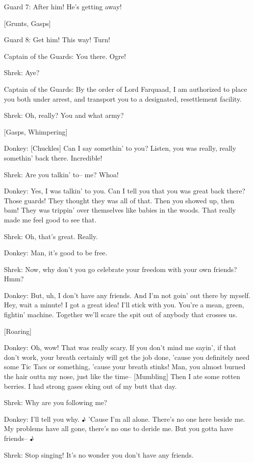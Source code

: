 \documentclass{article}
\begin{document}
Guard 7:
After him! He's getting away!

[Grunts, Gasps]

Guard 8:
Get him! This way! Turn!

Captain of the Guards: You there. Ogre!

Shrek:
Aye?

Captain of the Guards: By the order of Lord Farquaad, I am authorized to place you both under arrest, and transport you to a designated, resettlement facility.

Shrek:
Oh, really? You and what army?

[Gasps, Whimpering]

Donkey:
[Chuckles] Can I say somethin' to you? Listen, you was really, really somethin' back there. Incredible!

Shrek:
Are you talkin' to-- me? Whoa!

Donkey:
Yes, I was talkin' to you. Can I tell you that you was great back there? Those guards! They thought they was all of that. Then you showed up, then bam! They was trippin' over themselves like babies in the woods. That really made me feel good to see that.

Shrek:
Oh, that's great. Really.

Donkey:
Man, it's good to be free.

Shrek:
Now, why don't you go celebrate your freedom with your own friends? Hmm?

Donkey:
But, uh, I don't have any friends. And I'm not goin' out there by myself. Hey, wait a minute! I got a great idea! I'll stick with you. You're a mean, green, fightin' machine. Together we'll scare the spit out of anybody that crosses us.

[Roaring]

Donkey:
Oh, wow! That was really scary. If you don't mind me sayin', if that don't work, your breath certainly will get the job done, 'cause you definitely need some Tic Tacs or something, 'cause your breath stinks! Man, you almost burned the hair outta my nose, just like the time-- [Mumbling] Then I ate some rotten berries. I had strong gases eking out of my butt that day.

Shrek:
Why are you following me?

Donkey:
I'll tell you why. ♪ 'Cause I'm all alone. There's no one here beside me. My problems have all gone, there's no one to deride me. But you gotta have friends-- ♪

Shrek:
Stop singing! It's no wonder you don't have any friends.
\end{document}
